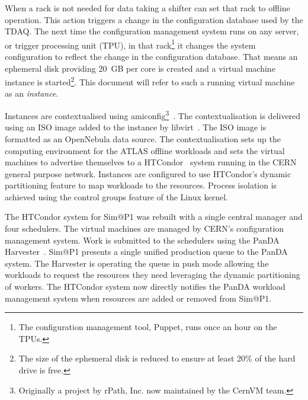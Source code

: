 \documentclass{webofc}
\begin{document}
When a rack is not needed for data taking a shifter can set that rack to
offline operation. This action triggers a change in the configuration database
used by
the TDAQ. The next time the configuration management system runs on any server,
or trigger processing unit (TPU), in that rack\footnote{The configuration
management tool, Puppet, runs once an
hour on the TPUs.} it changes the system configuration to reflect the change
in the configuration database. That means an ephemeral
disk providing 20~\textrm{GB} per core is created and a virtual machine instance
is started\footnote{The size of the ephemeral disk is reduced to ensure at least
20\% of the hard drive is free.}. This document will refer to such a
running virtual machine as an \textit{instance}.

Instances are contextualised using amiconfig\footnote{Originally a
project by rPath, Inc. now maintained by the CernVM team.}~\cite{amiconfig}.
The contextualisation is delivered using an ISO image added to the instance
by libvirt~\cite{libvirt}. The ISO image is formatted as an OpenNebula data
source. The
contextualisation sets up the computing environment for the ATLAS offline
workloads and sets the virtual machines to advertise themselves to a
HTCondor~\cite{condor} system running in the CERN general purpose network.
Instances are configured to use HTCondor's dynamic partitioning feature to
map workloads to the resources. Process isolation is achieved using the control
groups feature of the Linux kernel.

The HTCondor system for Sim@P1 was rebuilt with a single central manager and
four schedulers. The virtual machines are managed by CERN's configuration
management system. Work is submitted to the schedulers using the PanDA
Harvester~\cite{harvester}. Sim@P1 presents a single unified production queue to
the PanDA system. The Harvester is operating the queue in push mode allowing the
workloads to request the resources they need leveraging the dynamic partitioning
of workers.  The HTCondor system now directly notifies the PanDA workload
management system when resources are added or removed from Sim@P1.
\end{document}
